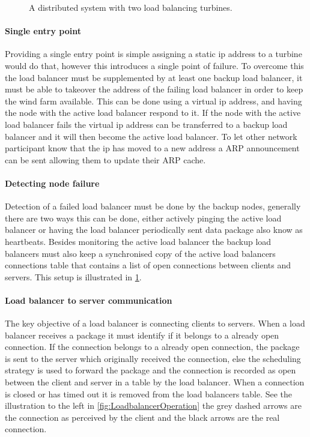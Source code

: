 \begin{figure}
	\centering	
	\scalebox{0.7}{}
	\caption[Distributed system with two load balancing turbines]{
		\label{fig:loadBalancingSetup2Balancers} 
		\footnotesize{%
			A distributed system with two load balancing turbines.
		}
	}
\end{figure}


\paragraph{Single entry point}
Providing a single entry point is simple assigning a static ip address to a turbine would do that, however this introduces a single point of failure.
To overcome this the load balancer must be supplemented by at least one backup load balancer, it must be able to takeover the address of the failing load balancer in order to keep the wind farm available.
This can be done using a virtual ip address, and having the node with the active load balancer respond to it.
If the node with the active load balancer fails the virtual ip address can be transferred to a backup load balancer and it will then become the active load balancer. To let other network participant know that the ip has moved to a new address a ARP announcement can be sent allowing them to update their ARP cache.

\paragraph{Detecting node failure}
Detection of a failed load balancer must be done by the backup nodes, generally there are two ways this can be done, either actively pinging the active load balancer or having the load balancer periodically sent data package also know as heartbeats.
Besides monitoring the active load balancer the backup load balancers must also keep a synchronised copy of the active load balancers connections table that contains a list of open connections between clients and servers.
This setup is illustrated in \cref{fig:loadBalancingSetup2Balancers}.


\paragraph{Load balancer to server communication}
The key objective of a load balancer is connecting clients to servers.
When a load balancer receives a package it must identify if it belongs to a already open connection.
If the connection belongs to a already open connection, the package is sent to the server which originally received the connection, else the scheduling strategy is used to forward the package and the connection is recorded as open between the client and server in a table by the load balancer.
When a connection is closed or has timed out it is removed from the load balancers table. See the illustration to the left in \cref{fig:LoadbalancerOperation} the grey dashed arrows are the connection as perceived by the client and the black arrows are the real connection.


